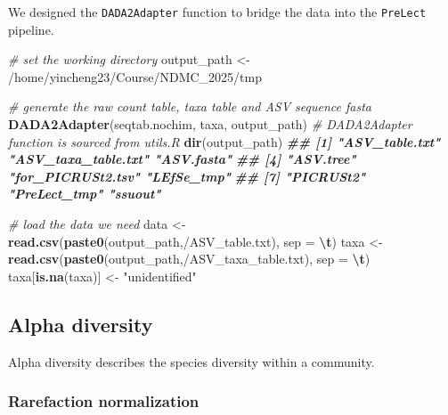 \documentclass[
]{article}
\newenvironment{Shaded}{\begin{snugshade}}{\end{snugshade}}
\newcommand{\AttributeTok}[1]{\textcolor[rgb]{0.13,0.29,0.53}{#1}}
\newcommand{\CommentTok}[1]{\textcolor[rgb]{0.56,0.35,0.01}{\textit{#1}}}
\newcommand{\DocumentationTok}[1]{\textcolor[rgb]{0.56,0.35,0.01}{\textbf{\textit{#1}}}}
\newcommand{\FunctionTok}[1]{\textcolor[rgb]{0.13,0.29,0.53}{\textbf{#1}}}
\newcommand{\NormalTok}[1]{#1}
\newcommand{\OtherTok}[1]{\textcolor[rgb]{0.56,0.35,0.01}{#1}}
\newcommand{\SpecialCharTok}[1]{\textcolor[rgb]{0.81,0.36,0.00}{\textbf{#1}}}
\newcommand{\StringTok}[1]{\textcolor[rgb]{0.31,0.60,0.02}{#1}}
\begin{document}
We designed the \texttt{DADA2Adapter} function to bridge the data into
the \texttt{PreLect} pipeline.

\begin{Shaded}
\begin{Highlighting}[]
\CommentTok{\# set the working  directory }
\NormalTok{output\_path }\OtherTok{\textless{}{-}} \StringTok{\textquotesingle{}/home/yincheng23/Course/NDMC\_2025/tmp\textquotesingle{}}

\CommentTok{\# generate the raw count table, taxa table and ASV sequence fasta}
\FunctionTok{DADA2Adapter}\NormalTok{(seqtab.nochim, taxa, output\_path) }\CommentTok{\# DADA2Adapter function is sourced from utils.R}
\FunctionTok{dir}\NormalTok{(output\_path)}
\DocumentationTok{\#\# [1] "ASV\_table.txt"      "ASV\_taxa\_table.txt" "ASV.fasta"         }
\DocumentationTok{\#\# [4] "ASV.tree"           "for\_PICRUSt2.tsv"   "LEfSe\_tmp"         }
\DocumentationTok{\#\# [7] "PICRUSt2"           "PreLect\_tmp"        "ssuout"}

\CommentTok{\# load the data we need}
\NormalTok{data }\OtherTok{\textless{}{-}} \FunctionTok{read.csv}\NormalTok{(}\FunctionTok{paste0}\NormalTok{(output\_path,}\StringTok{\textquotesingle{}/ASV\_table.txt\textquotesingle{}}\NormalTok{), }\AttributeTok{sep =} \StringTok{\textquotesingle{}}\SpecialCharTok{\textbackslash{}t}\StringTok{\textquotesingle{}}\NormalTok{)}
\NormalTok{taxa }\OtherTok{\textless{}{-}} \FunctionTok{read.csv}\NormalTok{(}\FunctionTok{paste0}\NormalTok{(output\_path,}\StringTok{\textquotesingle{}/ASV\_taxa\_table.txt\textquotesingle{}}\NormalTok{), }\AttributeTok{sep =} \StringTok{\textquotesingle{}}\SpecialCharTok{\textbackslash{}t}\StringTok{\textquotesingle{}}\NormalTok{)}
\NormalTok{taxa[}\FunctionTok{is.na}\NormalTok{(taxa)] }\OtherTok{\textless{}{-}} \StringTok{"unidentified"}
\end{Highlighting}
\end{Shaded}

\hypertarget{alpha-diversity}{%
\subsection{Alpha diversity}\label{alpha-diversity}}

Alpha diversity describes the species diversity within a community.

\hypertarget{rarefaction-normalization}{%
\subsubsection{Rarefaction
normalization}\label{rarefaction-normalization}}
\end{document}
